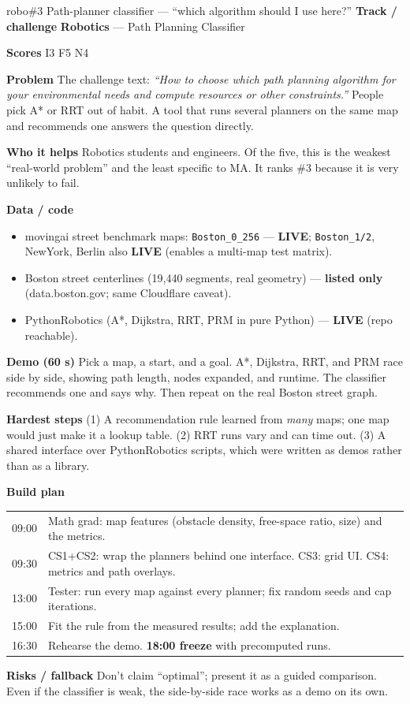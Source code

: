 \documentclass[11pt]{article}
\newcommand{\LIVE}{\textcolor{okgreen}{\textbf{LIVE}}}
\newcommand{\LISTED}{\textcolor{greyish}{\textbf{listed only}}}
\newcommand{\tagR}{\textcolor{robo}{\textbf{Robotics}}}
\newcommand{\field}[1]{\textbf{\textsf{#1}}\quad}
\begin{document}
\begin{ideacard}{robo}{\#3 \quad Path-planner classifier --- ``which algorithm should I use here?''}
\field{Track / challenge} \tagR{} --- Path Planning Classifier\par
\field{Scores} I3 F5 N4

\field{Problem} The challenge text: \emph{``How to choose which path planning algorithm for
your environmental needs and compute resources or other constraints.''} People pick A* or
RRT out of habit. A tool that runs several planners on the same map and recommends one
answers the question directly.

\field{Who it helps} Robotics students and engineers. Of the five, this is the weakest
``real-world problem'' and the least specific to MA. It ranks \#3 because it is very
unlikely to fail.

\field{Data / code}
\begin{itemize}
\item movingai street benchmark maps: \texttt{Boston\_0\_256} --- \LIVE; \texttt{Boston\_1/2},
  NewYork, Berlin also \LIVE{} (enables a multi-map test matrix).
\item Boston street centerlines (19,440 segments, real geometry) --- \LISTED{} (data.boston.gov; same Cloudflare caveat).
\item PythonRobotics (A*, Dijkstra, RRT, PRM in pure Python) --- \LIVE{} (repo reachable).
\end{itemize}

\field{Demo (60 s)} Pick a map, a start, and a goal. A*, Dijkstra, RRT, and PRM race side by
side, showing path length, nodes expanded, and runtime. The classifier recommends one and
says why. Then repeat on the real Boston street graph.

\field{Hardest steps} (1) A recommendation rule learned from \emph{many} maps; one map would
just make it a lookup table. (2) RRT runs vary and can time out. (3) A shared interface over
PythonRobotics scripts, which were written as demos rather than as a library.

\field{Build plan}\par\nopagebreak
\begin{tabularx}{\linewidth}{@{}L{1.2cm} X@{}}
09:00 & Math grad: map features (obstacle density, free-space ratio, size) and the metrics.\\
09:30 & CS1+CS2: wrap the planners behind one interface. CS3: grid UI. CS4: metrics and path overlays.\\
13:00 & Tester: run every map against every planner; fix random seeds and cap iterations.\\
15:00 & Fit the rule from the measured results; add the explanation.\\
16:30 & Rehearse the demo. \textbf{18:00 freeze} with precomputed runs.\\
\end{tabularx}

\field{Risks / fallback} Don't claim ``optimal''; present it as a guided comparison. Even if
the classifier is weak, the side-by-side race works as a demo on its own.
\end{ideacard}
\end{document}
